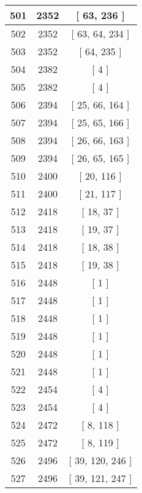 \begin{center}
\begin{longtable}[H]{|| c c c ||}
\hline
501 & 2352 & [ 63, 236 ] \\ 
\hline
502 & 2352 & [ 63, 64, 234 ] \\ 
\hline
503 & 2352 & [ 64, 235 ] \\ 
\hline
504 & 2382 & [ 4 ] \\ 
\hline
505 & 2382 & [ 4 ] \\ 
\hline
506 & 2394 & [ 25, 66, 164 ] \\ 
\hline
507 & 2394 & [ 25, 65, 166 ] \\ 
\hline
508 & 2394 & [ 26, 66, 163 ] \\ 
\hline
509 & 2394 & [ 26, 65, 165 ] \\ 
\hline
510 & 2400 & [ 20, 116 ] \\ 
\hline
511 & 2400 & [ 21, 117 ] \\ 
\hline
512 & 2418 & [ 18, 37 ] \\ 
\hline
513 & 2418 & [ 19, 37 ] \\ 
\hline
514 & 2418 & [ 18, 38 ] \\ 
\hline
515 & 2418 & [ 19, 38 ] \\ 
\hline
516 & 2448 & [ 1 ] \\ 
\hline
517 & 2448 & [ 1 ] \\ 
\hline
518 & 2448 & [ 1 ] \\ 
\hline
519 & 2448 & [ 1 ] \\ 
\hline
520 & 2448 & [ 1 ] \\ 
\hline
521 & 2448 & [ 1 ] \\ 
\hline
522 & 2454 & [ 4 ] \\ 
\hline
523 & 2454 & [ 4 ] \\ 
\hline
524 & 2472 & [ 8, 118 ] \\ 
\hline
525 & 2472 & [ 8, 119 ] \\ 
\hline
526 & 2496 & [ 39, 120, 246 ] \\ 
\hline
527 & 2496 & [ 39, 121, 247 ] \\ 
\hline
\end{longtable}
\end{center}
